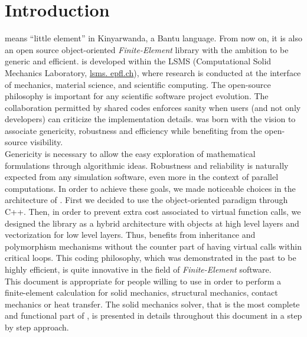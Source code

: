 \chapter{Introduction}

\akantu means ``little element'' in Kinyarwanda, a Bantu
language. From now on, it is also an open source object-oriented
\emph{Finite-Element} library with the ambition to be generic and
efficient.  \akantu is developed within the LSMS (Computational Solid
Mechanics Laboratory, \url{lsms.  epfl.ch}), where research is
conducted at the interface of mechanics, material science, and
scientific computing.  The open-source philosophy is important for any
scientific software project evolution. The collaboration permitted by
shared codes enforces sanity when users (and not only developers) can
criticize the implementation details.  \akantu was born with the
vision to associate genericity, robustness
and efficiency while benefiting from the open-source visibility.\\

Genericity is necessary to allow the easy exploration of mathematical
formulations through algorithmic ideas. Robustness and reliability is
naturally expected from any simulation software, even more in the
context of parallel computations.  In order to achieve these goals, we
made noticeable choices in the architecture of \akantu. First we
decided to use the object-oriented paradigm through C++. Then, in
order to prevent extra cost associated to virtual function calls, we
designed the library as a hybrid architecture with objects at high
level layers and vectorization for low level layers. Thus, \akantu
benefits from inheritance and polymorphism mechanisms without the
counter part of having virtual calls within critical loops.  This
coding philosophy, which was demonstrated in the past to be highly
efficient, is quite innovative in the field of \textit{Finite-Element} software. \\

This document is appropriate for people willing to use \akantu in
order to perform a finite-element calculation for solid mechanics,
structural mechanics, contact mechanics or heat transfer. The solid
mechanics solver, that is the most complete and functional part of
\akantu, is presented in details throughout this document in a step by
step approach.


